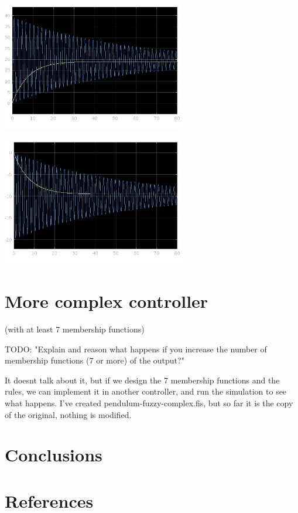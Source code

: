 \documentclass[11pt]{article}
\begin{document}
\includegraphics[width=0.6\textwidth]{simulation1.jpg}\par\vspace{1cm}
\includegraphics[width=0.6\textwidth]{simulation2.jpg}\par\vspace{1cm}

\section{More complex controller}

(with at least 7 membership functions)

TODO: "Explain and reason what happens if you increase the number of membership functions (7 or more) 
of the output?"

It doesnt talk about it, but if we design the 7 membership functions and the rules, we can implement it in another controller, and run the simulation to see what happens.
I've created pendulum-fuzzy-complex.fis, but so far it is the copy of the original, nothing is modified. 


\section{Conclusions}

\section*{References}
\printbibliography[heading=none]
\end{document}
